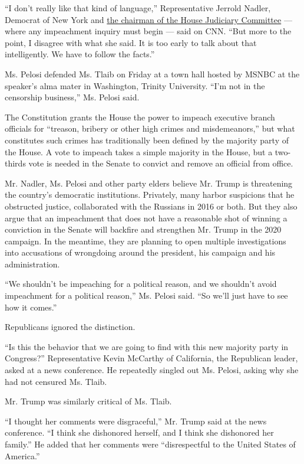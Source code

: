 ``I don't really like that kind of language,'' Representative Jerrold
Nadler, Democrat of New York and
\href{https://www.nytimes.com/2018/11/30/us/politics/jerrold-nadler-trump-impeachment.html}{the
chairman of the House Judiciary Committee} --- where any impeachment
inquiry must begin --- said on CNN. ``But more to the point, I disagree
with what she said. It is too early to talk about that intelligently. We
have to follow the facts.''

Ms. Pelosi defended Ms. Tlaib on Friday at a town hall hosted by MSNBC
at the speaker's alma mater in Washington, Trinity University. ``I'm not
in the censorship business,'' Ms. Pelosi said.

The Constitution grants the House the power to impeach executive branch
officials for ``treason, bribery or other high crimes and
misdemeanors,'' but what constitutes such crimes has traditionally been
defined by the majority party of the House. A vote to impeach takes a
simple majority in the House, but a two-thirds vote is needed in the
Senate to convict and remove an official from office.

Mr. Nadler, Ms. Pelosi and other party elders believe Mr. Trump is
threatening the country's democratic institutions. Privately, many
harbor suspicions that he obstructed justice, collaborated with the
Russians in 2016 or both. But they also argue that an impeachment that
does not have a reasonable shot of winning a conviction in the Senate
will backfire and strengthen Mr. Trump in the 2020 campaign. In the
meantime, they are planning to open multiple investigations into
accusations of wrongdoing around the president, his campaign and his
administration.

``We shouldn't be impeaching for a political reason, and we shouldn't
avoid impeachment for a political reason,'' Ms. Pelosi said. ``So we'll
just have to see how it comes.''

Republicans ignored the distinction.

``Is this the behavior that we are going to find with this new majority
party in Congress?'' Representative Kevin McCarthy of California, the
Republican leader, asked at a news conference. He repeatedly singled out
Ms. Pelosi, asking why she had not censured Ms. Tlaib.

Mr. Trump was similarly critical of Ms. Tlaib.

``I thought her comments were disgraceful,'' Mr. Trump said at the news
conference. ``I think she dishonored herself, and I think she dishonored
her family.'' He added that her comments were ``disrespectful to the
United States of America.''

